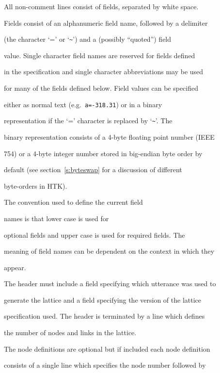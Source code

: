 All non-comment lines consist of fields, separated by white space.


Fields consist of an alphanumeric field name, followed by a delimiter


(the character `=' or `\verb|~|') and a (possibly ``quoted'') field


value.  Single character field names are reserved for fields defined


in the specification and single character abbreviations may be used


for many of the fields defined below. Field values can be specified


either as normal text (e.g.\ \verb|a=-318.31|) or in a binary


representation if the `=' character is replaced by `\verb|~|'. The


binary representation consists of a 4-byte floating point number (IEEE


754) or a 4-byte integer number stored in big-endian byte order by


default (see section~\ref{s:byteswap} for a discussion of different


byte-orders in HTK).





The convention used to define the current field


names is that lower case is used for


optional fields and upper case is used for required fields. The


meaning of field names can be dependent on the context in which they


appear.





The header must include a field specifying which utterance was used to


generate the lattice and a field specifying the version of the lattice


specification used.  The header is terminated by a line which defines


the number of nodes and links in the lattice.





The node definitions are optional but if included each node definition


consists of a single line which specifies the node number followed by


